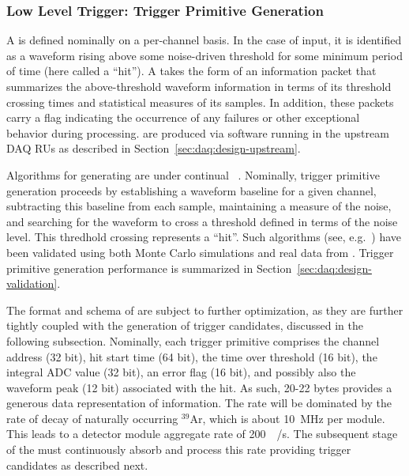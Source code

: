 \subsubsection{Low Level Trigger: Trigger Primitive Generation}
\label{sec:daq:design-trigger-primitives}

A  is defined nominally on a per-channel basis.
In the case of  input, it is identified as a waveform rising above
some noise-driven threshold for some minimum period of time (here called a
``hit'').
A  takes the form of an information packet that summarizes
the above-threshold waveform information in terms of its threshold crossing
times and statistical measures of its  samples. 
In addition, these packets carry a flag indicating the occurrence of any
failures or other exceptional behavior during  processing.
 are produced via software running in the upstream DAQ RUs
as described in Section~\ref{sec:daq:design-upstream}.

Algorithms for generating  are under continual
~\cite{docid-11275}.
Nominally, trigger primitive generation proceeds by establishing a waveform
baseline for a given channel, subtracting this baseline from each sample,
maintaining a measure of the noise, and searching for the waveform to cross a
threshold defined in terms of the noise level.
This thredhold crossing represents a ``hit''. 
Such algorithms (see, e.g.~\cite{docid-11236}) have been validated using both
Monte Carlo simulations and real data from . 
Trigger primitive generation performance is summarized in
Section~\ref{sec:daq:design-validation}.

The format and schema of  are subject to further
optimization, as they are further tightly coupled with the generation of trigger
candidates, discussed in the following subsection.
Nominally, each trigger primitive comprises the channel address (32 bit), hit
start time (64 bit), the time over threshold (16 bit), the integral ADC value
(32 bit), an error flag (16 bit), and possibly also the waveform peak (12 bit)
associated with the hit. 
As such, 20-22 bytes provides a generous data representation of
 information. 
The  rate will be dominated by the rate of decay of
naturally occurring $^{39}$Ar, which is about \SI{10}{\mega\hertz} per module.
This leads to a detector module aggregate rate of \SI{200}{\mega\byte/\second}.
The subsequent stage of the  must continuously absorb and process
this rate providing trigger candidates as described next.

